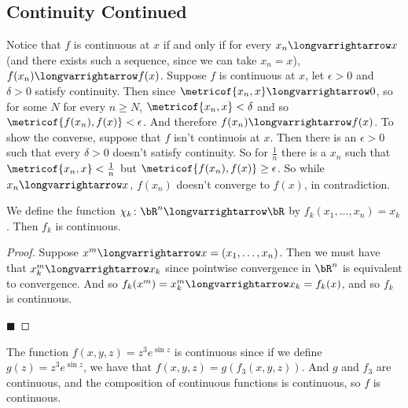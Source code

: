 \documentclass[10pt]{article}
\begin{document}


\bigskip

\subsection{Continuity Continued}

Notice that $f$ is continuous at $x$ if and only if for every $x_n\longvarrightarrow x$ (and there exists such a sequence, since we can take $x_n=x$), $f(x_n)\longvarrightarrow f(x)$.
Suppose $f$ is continuous at $x$, let $\epsilon>0$ and $\delta>0$ satisfy continuity.
Then since $\metricof{x_n,x}\longvarrightarrow0$, so for some $N$ for every $n\geq N$, $\metricof{x_n,x}<\delta$ and so $\metricof{f(x_n),f(x)}<\epsilon$.
And therefore $f(x_n)\longvarrightarrow f(x)$.
To show the converse, suppose that $f$ isn't continuois at $x$.
Then there is an $\epsilon>0$ such that every $\delta>0$ doesn't satisfy continuity.
So for $\frac1n$ there is a $x_n$ such that $\metricof{x_n,x}<\frac1n$ but $\metricof{f(x_n),f(x)}\geq\epsilon$.
So while $x_n\longvarrightarrow x$, $f(x_n)$ doesn't converge to $f(x)$, in contradiction.

\begin{prop*}

    We define the function $\chi_k\colon\bR^n\longvarrightarrow\bR$ by $f_k(x_1,\dots,x_n)=x_k$.
    Then $f_k$ is continuous.

\end{prop*}

\begin{proof}

    Suppose $x^m\longvarrightarrow x=(x_1,\dots,x_n)$.
    Then we must have that $x^m_k\longvarrightarrow x_k$ since pointwise convergence in $\bR^n$ is equivalent to convergence.
    And so $f_k(x^m)=x^m_k\longvarrightarrow x_k = f_k(x)$, and so $f_k$ is continuous.

    \hfill$\blacksquare$

\end{proof}


\begin{exam}

    The function $f(x,y,z)=z^3e^{\sin z}$ is continuous since if we define $g(z)=z^3 e^{\sin z}$, we have that $f(x,y,z)=g(f_3(x,y,z))$.
    And $g$ and $f_3$ are continuous, and the composition of continuous functions is continuous, so $f$ is continuous.

\end{exam}
\end{document}
